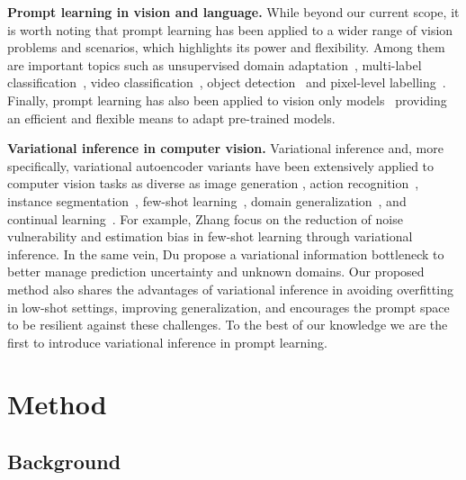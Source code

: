 \documentclass[10pt,twocolumn,letterpaper]{article}
\begin{document}
\textbf{Prompt learning in vision and language.}  While beyond our current scope, it is worth noting that prompt learning has been applied to a wider range of vision problems and scenarios, which highlights its power and flexibility. Among them are important topics such as unsupervised domain adaptation~\cite{ge2022domain}, multi-label classification~\cite{sun2022dualcoop}, video classification~\cite{ju2021prompting}, object detection~\cite{detpro_cvpr22,promptdet_eccv22} and pixel-level labelling~\cite{rao2022denseclip}. Finally, prompt learning has also been applied to vision only models~\cite{jia2022visual,sandler2022fine} providing an efficient and flexible means to adapt pre-trained models.

\textbf{Variational inference in computer vision.} 
Variational inference  and, more specifically, variational autoencoder variants have been extensively applied to computer vision tasks as diverse as image generation \cite{ramesh2021zero, saharia2022photorealistic, rombach2022high}, action recognition~\cite{mehrasavariational}, 
instance segmentation~\cite{homayounfar2020levelset}, 
few-shot learning~\cite{zhang2019variational, schonfeld2019generalized}, 
domain generalization~\cite{du2020learning}, and continual learning~\cite{derakhshani2021kernel}. 
For example, Zhang \etal \cite{zhang2019variational} focus on the reduction of noise vulnerability and estimation bias in few-shot learning through variational inference. In the same vein, Du \etal \cite{du2020learning} propose a variational information bottleneck to better manage prediction uncertainty and unknown domains. 
Our proposed method also shares the advantages of variational inference in avoiding overfitting in low-shot settings, improving generalization, and encourages the prompt space to be resilient against these challenges. To the best of our knowledge we are the first to introduce variational inference in prompt learning. 
 
\section{Method}
\vspace{-0.5em}



\subsection{Background}
\end{document}
